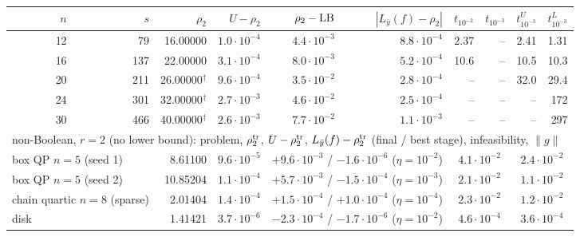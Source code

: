 \begin{tabular}{r r r r r r r r r r}\toprule
$n$ & $s$ & $\rho_2$ & $U-\rho_2$ & $\rho_2-{\rm LB}$ & $|L_{\bar y}(f)-\rho_2|$ & $t_{10^{-2}}$ & $t_{10^{-3}}$ & $t^{U}_{10^{-3}}$ & $t^{L}_{10^{-3}}$ \\\midrule
12 & 79 & 16.00000 & $1.0\cdot10^{-4}$ & $4.4\cdot10^{-3}$ & $8.8\cdot10^{-4}$ & 2.37 & -- & 2.41 & 1.31 \\
16 & 137 & 22.00000 & $3.1\cdot10^{-4}$ & $8.0\cdot10^{-3}$ & $5.2\cdot10^{-4}$ & 10.6 & -- & 10.5 & 10.3 \\
20 & 211 & 26.00000$^\dagger$ & $9.6\cdot10^{-4}$ & $3.5\cdot10^{-2}$ & $2.8\cdot10^{-4}$ & -- & -- & 32.0 & 29.4 \\
24 & 301 & 32.00000$^\dagger$ & $2.7\cdot10^{-3}$ & $4.6\cdot10^{-2}$ & $2.5\cdot10^{-4}$ & -- & -- & -- & 172 \\
30 & 466 & 40.00000$^\dagger$ & $2.6\cdot10^{-3}$ & $7.7\cdot10^{-2}$ & $1.1\cdot10^{-3}$ & -- & -- & -- & 297 \\
\midrule
\multicolumn{10}{l}{\footnotesize non-Boolean, $r=2$ (no lower bound): problem, $\rho_2^{\rm tr}$, $U-\rho^{\rm tr}_2$, $L_{\bar y}(f)-\rho^{\rm tr}_2$ (final / best stage), infeasibility, $\|g\|$} \\
\midrule
\multicolumn{2}{l}{box QP $n{=}5$ (seed 1)} & 8.61100 & $9.6\cdot10^{-5}$ & \multicolumn{2}{c}{$+9.6\cdot10^{-3}$ / $-1.6\cdot10^{-6}$ ($\eta{=}10^{-2}$)} & \multicolumn{2}{c}{$4.1\cdot10^{-2}$} & \multicolumn{2}{c}{$2.4\cdot10^{-2}$} \\
\multicolumn{2}{l}{box QP $n{=}5$ (seed 2)} & 10.85204 & $1.1\cdot10^{-4}$ & \multicolumn{2}{c}{$+5.7\cdot10^{-3}$ / $-1.5\cdot10^{-4}$ ($\eta{=}10^{-3}$)} & \multicolumn{2}{c}{$2.1\cdot10^{-2}$} & \multicolumn{2}{c}{$1.1\cdot10^{-2}$} \\
\multicolumn{2}{l}{chain quartic $n{=}8$ (sparse)} & 2.01404 & $1.4\cdot10^{-4}$ & \multicolumn{2}{c}{$+1.5\cdot10^{-4}$ / $+1.0\cdot10^{-4}$ ($\eta{=}10^{-4}$)} & \multicolumn{2}{c}{$2.3\cdot10^{-2}$} & \multicolumn{2}{c}{$1.2\cdot10^{-2}$} \\
\multicolumn{2}{l}{disk} & 1.41421 & $3.7\cdot10^{-6}$ & \multicolumn{2}{c}{$-2.3\cdot10^{-4}$ / $-1.7\cdot10^{-6}$ ($\eta{=}10^{-2}$)} & \multicolumn{2}{c}{$4.6\cdot10^{-4}$} & \multicolumn{2}{c}{$3.6\cdot10^{-4}$} \\
\bottomrule\end{tabular}
